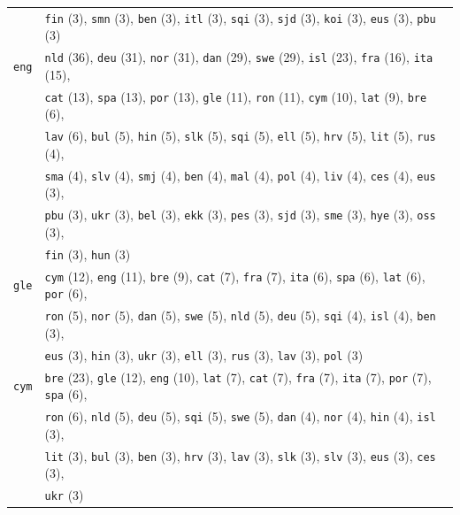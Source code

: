 \begin{center}
\begin{longtable}{ll}
 & \texttt{fin} (3), \texttt{smn} (3), \texttt{ben} (3), \texttt{itl} (3), \texttt{sqi} (3), \texttt{sjd} (3), \texttt{koi} (3), \texttt{eus} (3), \texttt{pbu} (3) \\
\texttt{eng} & \texttt{nld} (36), \texttt{deu} (31), \texttt{nor} (31), \texttt{dan} (29), \texttt{swe} (29), \texttt{isl} (23), \texttt{fra} (16), \texttt{ita} (15),\\
 & \texttt{cat} (13), \texttt{spa} (13), \texttt{por} (13), \texttt{gle} (11), \texttt{ron} (11), \texttt{cym} (10), \texttt{lat} (9), \texttt{bre} (6),\\
 & \texttt{lav} (6), \texttt{bul} (5), \texttt{hin} (5), \texttt{slk} (5), \texttt{sqi} (5), \texttt{ell} (5), \texttt{hrv} (5), \texttt{lit} (5), \texttt{rus} (4),\\
 & \texttt{sma} (4), \texttt{slv} (4), \texttt{smj} (4), \texttt{ben} (4), \texttt{mal} (4), \texttt{pol} (4), \texttt{liv} (4), \texttt{ces} (4), \texttt{eus} (3),\\
 & \texttt{pbu} (3), \texttt{ukr} (3), \texttt{bel} (3), \texttt{ekk} (3), \texttt{pes} (3), \texttt{sjd} (3), \texttt{sme} (3), \texttt{hye} (3), \texttt{oss} (3),\\
 & \texttt{fin} (3), \texttt{hun} (3) \\
\texttt{gle} & \texttt{cym} (12), \texttt{eng} (11), \texttt{bre} (9), \texttt{cat} (7), \texttt{fra} (7), \texttt{ita} (6), \texttt{spa} (6), \texttt{lat} (6), \texttt{por} (6), \\
 & \texttt{ron} (5), \texttt{nor} (5), \texttt{dan} (5), \texttt{swe} (5), \texttt{nld} (5), \texttt{deu} (5), \texttt{sqi} (4), \texttt{isl} (4), \texttt{ben} (3), \\
 & \texttt{eus} (3), \texttt{hin} (3), \texttt{ukr} (3), \texttt{ell} (3), \texttt{rus} (3), \texttt{lav} (3), \texttt{pol} (3) \\
\texttt{cym} & \texttt{bre} (23), \texttt{gle} (12), \texttt{eng} (10), \texttt{lat} (7), \texttt{cat} (7), \texttt{fra} (7), \texttt{ita} (7), \texttt{por} (7), \texttt{spa} (6), \\
 & \texttt{ron} (6), \texttt{nld} (5), \texttt{deu} (5), \texttt{sqi} (5), \texttt{swe} (5), \texttt{dan} (4), \texttt{nor} (4), \texttt{hin} (4), \texttt{isl} (3), \\
 & \texttt{lit} (3), \texttt{bul} (3), \texttt{ben} (3), \texttt{hrv} (3), \texttt{lav} (3), \texttt{slk} (3), \texttt{slv} (3), \texttt{eus} (3), \texttt{ces} (3), \\
 & \texttt{ukr} (3) \\

\end{longtable}
\end{center}

